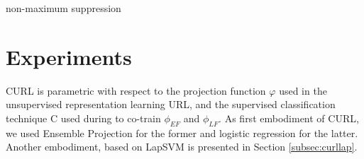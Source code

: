\documentclass[journal,11pt]{IEEEtran}
\newcommand{\ADD}[1]{#1}
\newcommand{\emb}{embodiment}
\begin{document}

\begin{algorithm}[!tbp]
\Begin{
find $\{\mathcal{X}_\star, \hat{\mathcal{Y}}_\star \}$ with $\mathcal{X}_\star \in \mathcal{X}$, $\hat{\mathcal{Y}}_\star \in \hat{\mathcal{Y}}$ s.t.: \\
$\quad \mathbf{w}_\star[k] = \displaystyle \text{arg} \! \max_{j} \mathbf{w}_j[k] $, with $\mathbf{w}_j \in \mathcal{W}$\\
}
\caption{non-maximum suppression}
\label{alg:nms}
\end{algorithm}

\section{Experiments}
\label{sec:experiments}

CURL is parametric with respect to the projection function $\varphi$ used in the unsupervised representation learning \ADD{URL}, and the supervised classification technique \ADD{C} used during to co-train $\phi_{\scriptscriptstyle EF}$ and $\phi_{\scriptscriptstyle LF}$. \ADD{As first \emb{ } of CURL,} we used Ensemble Projection \cite{dai2013ensemble} for the former and logistic regression for the latter. \ADD{Another \emb, based on LapSVM \cite{belkin2006manifold} is presented in Section \ref{subsec:curllap}.}
\end{document}
